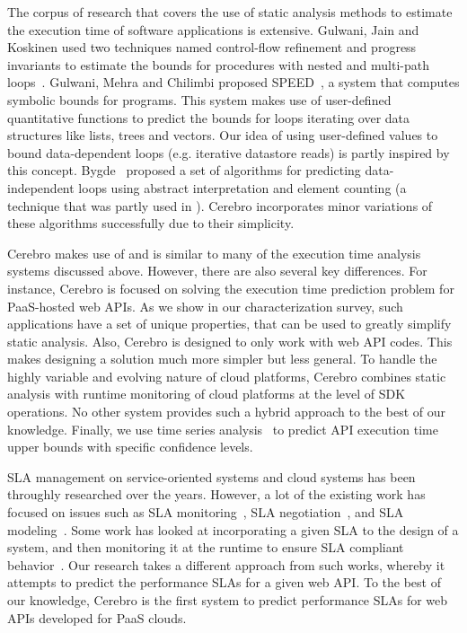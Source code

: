 The corpus of research that covers the use of static analysis methods 
to estimate the execution time of software applications is 
extensive. Gulwani, Jain and Koskinen used two techniques named control-flow
 refinement and progress invariants to estimate the bounds for procedures with nested and multi-path loops~\cite{Gulwani:2009:CRP:1542476.1542518}.
 Gulwani, Mehra and Chilimbi proposed SPEED~\cite{Gulwani:2009:SPE:1480881.1480898}, a system that computes symbolic bounds for programs. This
 system makes use of user-defined quantitative functions to predict the bounds for loops iterating over
data structures like lists, trees and vectors. Our idea of using user-defined values to bound
 data-dependent loops (e.g. iterative datastore reads) is partly inspired by this concept.
 Bygde~\cite{bygde2010static} proposed a set of algorithms for predicting data-independent loops using abstract interpretation
 and element counting (a technique that was partly used in \cite{ermedahl2007loop}). 
Cerebro incorporates minor variations of these algorithms successfully due to their
simplicity.  
 
Cerebro makes use of and is similar to many of the execution time analysis 
systems discussed above.  However, there are also several key differences. 
For instance, Cerebro is focused on solving the
execution time prediction problem for PaaS-hosted web APIs. 
As we show in our characterization survey, such applications 
have a set of unique properties, that can be used to greatly simplify static analysis.
Also, Cerebro is designed to only work with web API codes. This makes designing 
a solution much more simpler but less general.
To handle the highly variable and evolving nature of
cloud platforms, Cerebro combines static analysis with runtime
monitoring of cloud platforms at the level of SDK operations. No other 
system provides such a hybrid approach to the best of our knowledge. 
Finally,
we use time series analysis~\cite{Nurmi:2007:QQB:1791551.1791556} 
to predict API execution time upper bounds with specific confidence
levels.

SLA management on service-oriented systems and cloud systems has been 
throughly researched
over the years. However, a lot of the existing work has focused on issues 
such as SLA monitoring~\cite{Michlmayr:2009:CQM:1657755.1657756,Tripathy:2011:MMS:1980822.1980832,Raimondi:2008:EOM:1453101.1453125,Bertolino:2007:SUS:1294904.1294914}, SLA negotiation~\cite{Mahbub:2011:PSN:2061042.2062022,Yaqub:2014:ONS:2680847.2681496,6546098}, and SLA modeling~\cite{Chau:2008:ASM:1463788.1463802,Stamou:2013:SGM:2516588.2516592,Skene:2004:PSL:998675.999422}. 
Some work has looked at incorporating a given SLA to the design of a system, and
then monitoring it at the runtime to ensure SLA compliant behavior~\cite{He:2013:TSC:2532443.2532449}. 
Our research takes a
different approach from such works, whereby it attempts to predict the performance SLAs for a
given web API. To the best of our knowledge, Cerebro is the first system to predict performance SLAs for web APIs developed for PaaS clouds.

